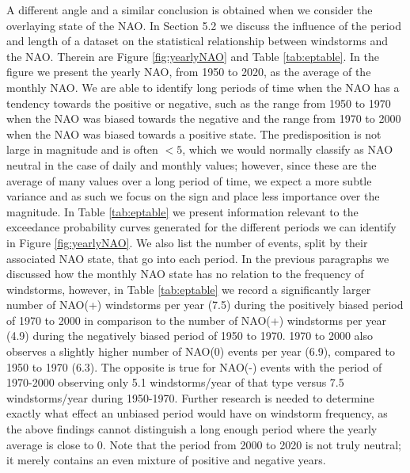         A different angle and a similar conclusion is obtained when we consider the overlaying state of the NAO. In Section 5.2 we discuss the influence of the period and length of a dataset on the statistical relationship between windstorms and the NAO. Therein are Figure \ref{fig:yearlyNAO} and Table \ref{tab:eptable}. In the figure we present the yearly NAO, from 1950 to 2020, as the average of the monthly NAO. We are able to identify long periods of time when the NAO has a tendency towards the positive or negative, such as the range from 1950 to 1970 when the NAO was biased towards the negative and the range from 1970 to 2000 when the NAO was biased towards a positive state. The predisposition is not large in magnitude and is often $<5$, which we would normally classify as NAO neutral in the case of daily and monthly values; however, since these are the average of many values over a long period of time, we expect a more subtle variance and as such we focus on the sign and place less importance over the magnitude. 
        In Table \ref{tab:eptable} we present information relevant to the exceedance probability curves generated for the different periods we can identify in Figure \ref{fig:yearlyNAO}. We also list the number of events, split by their associated NAO state, that go into each period. In the previous paragraphs we discussed how the monthly NAO state has no relation to the frequency of windstorms, however, in Table \ref{tab:eptable} we record a significantly larger number of NAO(+) windstorms per year (7.5) during the positively biased period of 1970 to 2000 in comparison to the number of NAO(+) windstorms per year (4.9) during the negatively biased period of 1950 to 1970. 1970 to 2000 also observes a slightly higher number of NAO(0) events per year (6.9), compared to 1950 to 1970 (6.3). The opposite is true for NAO(-) events with the period of 1970-2000 observing only 5.1 windstorms/year of that type versus 7.5 windstorms/year during 1950-1970. Further research is needed to determine exactly what effect an unbiased period would have on windstorm frequency, as the above findings cannot distinguish a long enough period where the yearly average is close to 0. Note that the period from 2000 to 2020 is not truly neutral; it merely contains an even mixture of positive and negative years.

